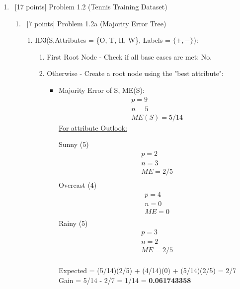 \documentclass[8pt, fullpage,letterpaper]{article}
\begin{document}
\begin{enumerate}
\begin{table}[h]
\begin{tabular}{cccc|c||cccc|c}
		\end{tabular}
	\end{table}




\color{black}
\item~[17 points]  Problem 1.2 (Tennis Training Dataset)
\begin{enumerate}
	\item~[7 points] Problem 1.2a (Majority Error Tree)

	\color{violet}
	\begin{enumerate}

	 	\item ID3(S,Attributes = \{O, T, H, W\}, Labels = $ \{+, -\}$): 
			\begin{enumerate}
			\item First Root Node - Check if all base cases are met: {\color{red} No}.
			\item Otherwise - Create a root node using the "best attribute":
				\begin{itemize}
					\item Majority Error of S, ME(S):
						\begin{align*}
						    	& p = 9\\
							& n = 5 \\
						    	& ME(S) = 5/14
					      \end{align*}
						\underline {For attribute Outlook:} 
							\vspace{-5pt}
							\begin{multicols}{3}
								Sunny (5)
			 						\begin{align*}
									    	& p = 2\\
										& n = 3 \\
									    	& ME = 2/5\\
								      \end{align*}
								Overcast (4)
			 						\begin{align*}
									    	& p = 4\\
										& n = 0 \\
									    	& ME = 0\\
								      \end{align*}
								Rainy (5)
			 						\begin{align*}
									    	& p = 3\\
										& n = 2 \\
									    	& ME = 2/5\\
								      \end{align*}
							\end{multicols}
							\vspace{-20pt}
							Expected = (5/14)(2/5) + (4/14)(0) + (5/14)(2/5) = 2/7\\
							Gain = 5/14 - 2/7 = 1/14 = {\bf 0.061743358}\\


\end{itemize}
\end{enumerate}
\end{enumerate}
\end{enumerate}
\end{enumerate}
\end{document}
